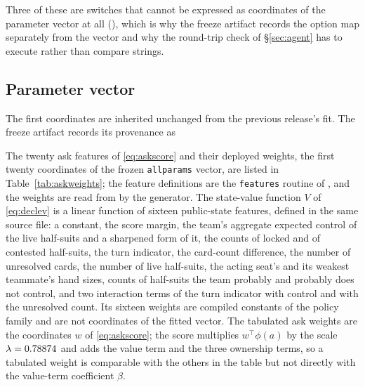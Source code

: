 \begin{center}\tabfont

\end{center}

\noindent
Three of these are switches that cannot be expressed as coordinates of the parameter vector at all
(\vsevenNotVectorisable{}), which is why the freeze artifact records the option map separately
from the vector and why the round-trip check of \S\ref{sec:agent} has to execute rather than
compare strings.

\subsection*{Parameter vector}

\begin{center}\tabfont

\end{center}

\noindent
\vsevenLayoutNote{}

The first \vsevenVsixCoords{} coordinates are inherited unchanged from the previous release's fit.
The freeze artifact records its provenance as

\begin{quote}\ttfamily\footnotesize\raggedright
\vsevenInheritedVector{}
\end{quote}

\noindent
The twenty ask features of \eqref{eq:askscore} and their deployed weights, the first twenty
coordinates of the frozen \texttt{allparams} vector, are listed in Table~\ref{tab:askweights}; the
feature definitions are the \texttt{features} routine of , and the
weights are read from  by the generator. The state-value
function $V$ of \eqref{eq:declev} is a linear function of sixteen public-state features, defined in
the same source file: a constant, the score margin, the team's aggregate expected control of the
live half-suits and a sharpened form of it, the counts of locked and of contested half-suits, the
turn indicator, the card-count difference, the number of unresolved cards, the number of live
half-suits, the acting seat's and its weakest teammate's hand sizes, counts of half-suits the team
probably and probably does not control, and two interaction terms of the turn indicator with
control and with the unresolved count. Its sixteen weights are compiled constants of the \vfive{}
policy family and are not coordinates of the fitted vector. The tabulated ask weights are the
coordinates $w$ of \eqref{eq:askscore}; the score multiplies $w^{\!\top}\phi(a)$ by the scale
$\lambda = 0.78874{}$ and adds the value term and the three ownership terms, so a
tabulated weight is comparable with the others in the table but not directly with the value-term
coefficient $\beta$.

